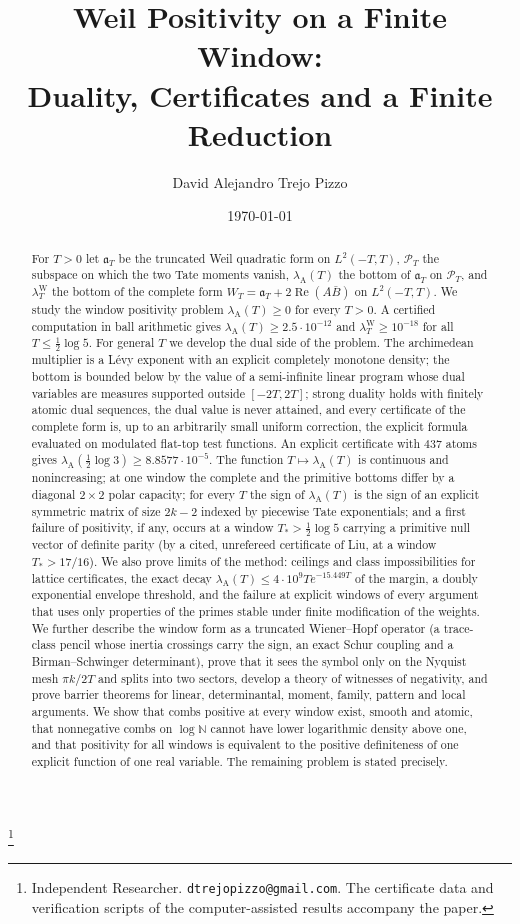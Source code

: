 \documentclass[11pt]{amsart}
\theoremstyle{definition}
\theoremstyle{remark}
\newcommand{\N}{\mathbb N}
\newcommand{\Rel}{\operatorname{Re}}
\newcommand{\PT}{\mathcal P_T}
\newcommand{\lamW}{\lambda^{\mathrm W}_T}
\newcommand{\lamA}{\lambda_{\mathrm A}(T)}
\begin{document}
\title[Weil positivity on a finite window]
{Weil Positivity on a Finite Window:\\
Duality, Certificates and a Finite Reduction}

\author{David Alejandro Trejo Pizzo}
\thanks{Independent Researcher. \texttt{dtrejopizzo@gmail.com}. The certificate data and verification
scripts of the computer-assisted results accompany the paper.}

\date{\today}

\begin{abstract}
For $T>0$ let $\mathfrak a_T$ be the truncated Weil quadratic form on $L^2(-T,T)$, $\PT$ the
subspace on which the two Tate moments vanish, $\lamA$ the bottom of $\mathfrak a_T$ on $\PT$, and
$\lamW$ the bottom of the complete form $W_T=\mathfrak a_T+2\Rel(A\bar B)$ on $L^2(-T,T)$. We study
the window positivity problem $\lamA\ge0$ for every $T>0$. A certified computation in ball
arithmetic gives $\lamA\ge2.5\cdot10^{-12}$ and $\lamW\ge10^{-18}$ for all $T\le\frac12\log5$. For
general $T$ we develop the dual side of the problem. The archimedean multiplier is a L\'evy exponent
with an explicit completely monotone density; the bottom is bounded below by the value of a
semi-infinite linear program whose dual variables are measures supported outside $[-2T,2T]$; strong
duality holds with finitely atomic dual sequences, the dual value is never attained, and every
certificate of the complete form is, up to an arbitrarily small uniform correction, the explicit formula
evaluated on modulated flat-top test functions. An explicit certificate with $437$ atoms gives
$\lambda_{\mathrm A}(\frac12\log3)\ge8.8577\cdot10^{-5}$. The function $T\mapsto\lamA$ is continuous and
nonincreasing; at one window the complete and the primitive bottoms differ by a diagonal $2\times2$
polar capacity; for every $T$ the sign of $\lamA$ is the sign of an explicit symmetric matrix of size
$2k-2$ indexed by piecewise Tate exponentials; and a first failure of positivity, if any, occurs at a
window $T_*>\frac12\log5$ carrying a primitive null vector of definite parity (by a cited, unrefereed
certificate of Liu, at a window $T_*>17/16$). We also prove limits of
the method: ceilings and class impossibilities for lattice certificates, the exact decay
$\lamA\le4\cdot10^9Te^{-15.449T}$ of the margin, a doubly exponential envelope threshold, and the
failure at explicit windows of every argument that uses only properties of the primes stable under
finite modification of the weights. We further describe the window form as a truncated Wiener--Hopf operator (a trace-class pencil whose
inertia crossings carry the sign, an exact Schur coupling and a Birman--Schwinger determinant), prove that it
sees the symbol only on the Nyquist mesh $\pi k/2T$ and splits into two sectors, develop a theory of
witnesses of negativity, and prove barrier theorems for linear, determinantal, moment, family, pattern and
local arguments. We show that combs positive at every window exist, smooth and atomic, that nonnegative combs on $\log\N$ cannot
have lower logarithmic density above one, and that positivity for all windows is equivalent to the positive definiteness of one explicit function
of one real variable. The remaining problem is stated precisely.
\end{abstract}
\end{document}
